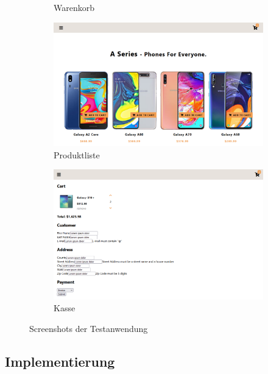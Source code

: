 \begin{figure}
\begin{subfigure}[b]{0.3\textwidth}
        \caption{Warenkorb}
        \label{fig:online-shopping-website-cart}
    \end{subfigure}
    
    \begin{subfigure}[b]{0.9\textwidth}
        \centering
        \includegraphics[width=\textwidth]{pictures/Products_Half.png}
        \caption{Produktliste}
        \label{fig:online-shopping-website-product-list}
    \end{subfigure}
    \begin{subfigure}[b]{0.9\textwidth}
        \centering
        \includegraphics[width=\textwidth]{pictures/Checkout.png}
        \caption{Kasse}
        \label{fig:online-shopping-website-checkout}
    \end{subfigure}

    \caption{Screenshots der Testanwendung}
    \label{fig:online-shopping-website}
\end{figure}

\subsection*{Implementierung}

